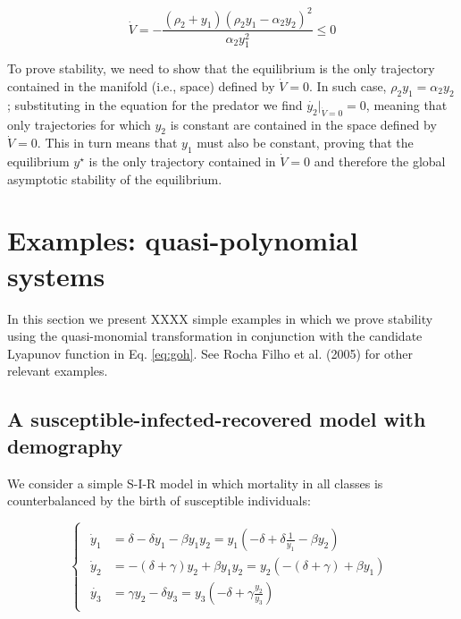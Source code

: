 \documentclass{article}
\begin{document}
\begin{cb}
\begin{equation}
\dot{V} = -\frac{(\rho_2 + y_1) (\rho_2 y_1 - \alpha_2 y_2)^2}{\alpha_2 y_1^2} \leq 0
\end{equation}

To prove stability, we need to show that the equilibrium is the only trajectory contained in the manifold (i.e., space) defined by $\dot{V} = 0$. In such case, $\rho_2 y_1 = \alpha_2 y_2$; substituting in the equation for the predator we find $\dot{y_2}|_{\dot{V} = 0} = 0$, meaning that only trajectories for which $y_2$ is constant are contained in the space defined by $\dot{V} = 0$. This in turn means that $y_1$ must also be constant, proving that the equilibrium $y^\star$ is the only trajectory contained in $\dot{V} = 0$ and therefore the global asymptotic stability of the equilibrium.
\end{cb}

\hypertarget{examples-quasi-polynomial-systems}{%
\section{Examples: quasi-polynomial
systems}\label{examples-quasi-polynomial-systems}}

In this section we present XXXX simple examples in which we prove
stability using the quasi-monomial transformation in conjunction with
the candidate Lyapunov function in Eq. \ref{eq:goh}. See Rocha Filho et
al. (2005) for other relevant examples.

\hypertarget{a-susceptible-infected-recovered-model-with-demography}{%
\subsection{A susceptible-infected-recovered model with
demography}\label{a-susceptible-infected-recovered-model-with-demography}}

\label{sec:sir}

We consider a simple S-I-R model in which mortality in all classes is
counterbalanced by the birth of susceptible individuals:

\begin{equation}
\label{eq:sir}
\begin{cases}
\begin{aligned}
\dot{y}_1 &= \delta - \delta y_1 - \beta y_1 y_2 = y_1 \left(-\delta + \delta \frac{1}{y_1} - \beta y_2 \right)\\
\dot{y}_2 &= - (\delta + \gamma) y_2 + \beta y_1 y_2 = y_2 \left(-(\delta + \gamma) + \beta y_1 \right)\\
\dot{y_3} &= \gamma y_2 - \delta y_3 = y_3 \left(-\delta + \gamma \frac{y_2}{y_3} \right)
\end{aligned}
\end{cases}
\end{equation}
\end{document}
